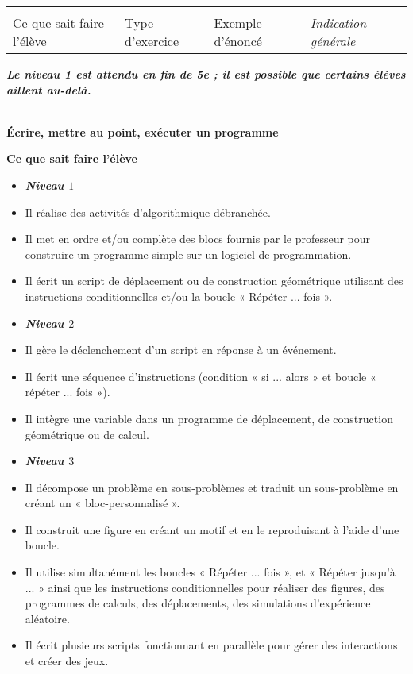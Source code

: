 \documentclass[10pt]{article}
\newcommand{\RR}{\begin{tikzpicture} \draw[Bleu,fill=Bleu] (0,0) circle (0.06); \end{tikzpicture}}
\newcommand{\LR}{\begin{tikzpicture} \draw[Bleu,fill=Bleu] (0.05,0) -- (0,0.075) -- (-0.05,0) -- (0,-0.075) --cycle; \end{tikzpicture}}
\newcommand{\CR}{\begin{tikzpicture} \draw[Bleu,fill=Bleu] (0,0) -- (0,0.1) -- (0.1,0.1) -- (0.1,0) -- cycle; \end{tikzpicture}}
\newcommand{\theme}[1]
{\vspace{4ex}\begin{tabularx}{\textwidth}{|XXXX|}\arrayrulecolor{Bleu}
    \multicolumn{4}{c}{\sffamily\color{white}\cellcolor{Bleu}\Large{\phantom{É}#1\phantom{É}}\rmfamily} \\\normalsize
    \RR{} Ce que sait faire l'élève & \LR{} Type d'exercice & \CR{} Exemple d'énoncé & \textit{Indication générale} \\\hline
\end{tabularx}\vspace{3ex}}
\newcommand{\competence}[1]{\par\color{Bleu}\makebox[\linewidth]{\rule{\textwidth}{2pt}}\\{\bfseries\Large#1}\color{black}\vspace{1em}}
\newenvironment{savoireleves}{%
    \renewcommand{\labelitemi}{\RR}%
    \color{black}%
    \par\textbf{Ce que sait faire l'élève}
    \begin{itemize}
    \setlength{\itemsep}{-0.2em}%
}{
    \end{itemize}
}
\begin{document}
    \clearpage
    \theme{ALGORITHME ET PROGRAMMATION}
    \centerline{\textbf{\textit{Le niveau 1 est attendu en fin de 5e ; il est possible que certains élèves aillent au-delà.}}}
    \competence{Écrire, mettre au point, exécuter un programme}

    \begin{savoireleves}
        \item[] \textbf{\textit{Niveau $1$}}
        \item Il réalise des activités d’algorithmique débranchée.
        \item Il met en ordre et/ou complète des blocs fournis par le professeur pour construire un programme simple sur un logiciel de programmation.
        \item Il écrit un script de déplacement ou de construction géométrique utilisant des instructions conditionnelles et/ou la boucle « Répéter ... fois ».
        \item[] \textbf{\textit{Niveau $2$}}
        \item Il gère le déclenchement d'un script en réponse à un événement.
        \item Il écrit une séquence d’instructions (condition « si ... alors » et boucle « répéter ... fois »).
        \item Il intègre une variable dans un programme de déplacement, de construction géométrique ou de calcul.
        \item[] \textbf{\textit{Niveau $3$}}
        \item Il décompose un problème en sous-problèmes et traduit un sous-problème en créant un « bloc-personnalisé ».
        \item Il construit une figure en créant un motif et en le reproduisant à l’aide d’une boucle.
        \item Il utilise simultanément les boucles « Répéter ... fois », et « Répéter jusqu’à ... » ainsi que les instructions conditionnelles pour réaliser des figures, des programmes de calculs, des déplacements, des simulations d’expérience aléatoire.
        \item Il écrit plusieurs scripts fonctionnant en parallèle pour gérer des interactions et créer des jeux.
    \end{savoireleves}
\end{document}
